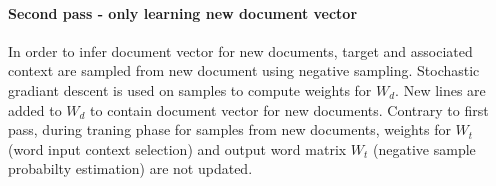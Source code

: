 \documentclass[a4paper]{article}
\begin{document}
\paragraph{ Second pass - only learning new document vector}
In order to infer document vector for new documents, target and associated context are sampled from new document using negative sampling. Stochastic gradiant descent is used on samples to compute weights for $W_{d}$. New lines are added to $W_{d}$ to contain document vector for new documents.
Contrary to first pass, during traning phase for samples from new documents, weights for $W_{t}$ (word input context selection) and output word matrix $W_{t}$ (negative sample probabilty estimation) are not updated.%


\end{document}
